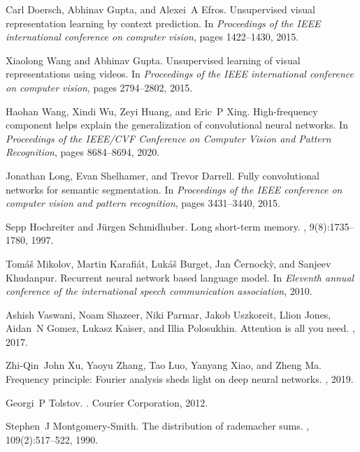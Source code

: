\documentclass{article}
\begin{document}
\begin{thebibliography}{10}
Carl Doersch, Abhinav Gupta, and Alexei~A Efros.
\newblock Unsupervised visual representation learning by context prediction.
\newblock In {\em Proceedings of the IEEE international conference on computer
  vision}, pages 1422--1430, 2015.

Xiaolong Wang and Abhinav Gupta.
\newblock Unsupervised learning of visual representations using videos.
\newblock In {\em Proceedings of the IEEE international conference on computer
  vision}, pages 2794--2802, 2015.

Haohan Wang, Xindi Wu, Zeyi Huang, and Eric~P Xing.
\newblock High-frequency component helps explain the generalization of
  convolutional neural networks.
\newblock In {\em Proceedings of the IEEE/CVF Conference on Computer Vision and
  Pattern Recognition}, pages 8684--8694, 2020.

Jonathan Long, Evan Shelhamer, and Trevor Darrell.
\newblock Fully convolutional networks for semantic segmentation.
\newblock In {\em Proceedings of the IEEE conference on computer vision and
  pattern recognition}, pages 3431--3440, 2015.

Sepp Hochreiter and J{\"u}rgen Schmidhuber.
\newblock Long short-term memory.
, 9(8):1735--1780, 1997.

Tom{\'a}{\v{s}} Mikolov, Martin Karafi{\'a}t, Luk{\'a}{\v{s}} Burget, Jan
  {\v{C}}ernock{\`y}, and Sanjeev Khudanpur.
\newblock Recurrent neural network based language model.
\newblock In {\em Eleventh annual conference of the international speech
  communication association}, 2010.

Ashish Vaswani, Noam Shazeer, Niki Parmar, Jakob Uszkoreit, Llion Jones,
  Aidan~N Gomez, Lukasz Kaiser, and Illia Polosukhin.
\newblock Attention is all you need.
, 2017.

Zhi-Qin~John Xu, Yaoyu Zhang, Tao Luo, Yanyang Xiao, and Zheng Ma.
\newblock Frequency principle: Fourier analysis sheds light on deep neural
  networks.
, 2019.

Georgi~P Tolstov.
.
\newblock Courier Corporation, 2012.

Stephen~J Montgomery-Smith.
\newblock The distribution of rademacher sums.
,
  109(2):517--522, 1990.


\end{thebibliography}
\end{document}
